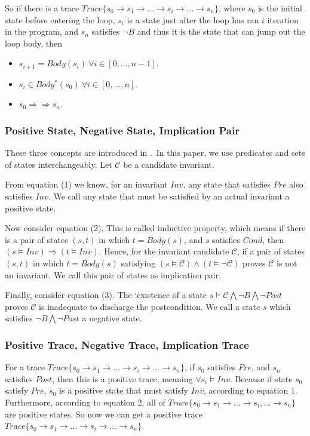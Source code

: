 So if there is a trace $Trace\{s_0 \to s_1 \to ...\to s_i \to ... \to s_n\}$, 
where $s_0$ is the initial state before entering the loop, 
$s_i$ is a state just after the loop has ran $i$ iteration in the program,
and $s_n$ satisfies $\neg B$ and thus it is the state that can jump out the loop body,
then 
\begin{itemize}
\item $s_{i+1} = Body(s_i)\ \forall i \in [0, \ldots, n-1]$.
\item $s_{i} \in Body^*(s_0)\ \forall i \in [0, \ldots, n]$.
\item $s_{0} \Rightarrow\Rightarrow s_{n}$.
\end{itemize}



\subsubsection{Positive State, Negative State, Implication Pair}
These three concepts are introduced in \cite{sharma2014invariant}.\
In this paper, we use predicates and sets of states interchangeably.
Let $\mathcal{C}$ be a candidate invariant.

From equation (1) we know, for an invariant $Inv$, 
any state that satisfies $Pre$ also satisfies $Inv$. 
We call any state that must be satisfied by an actual invariant a positive state. 


Now consider equation (2).
This is called inductive property, which means if there is a pair of states $(s, t)$ in which $t = Body(s)$, 
and $s$ satisfies $Cond$, then $(s \models Inv) \Rightarrow (t \models {Inv})$. 
Hence, for the invariant candidate $\mathcal{C}$, 
if a pair of states $(s, t)$ in which $t = Body(s)$ satisfying $(s \models \mathcal{C}) \land (t \models \neg \mathcal{C})$ proves $\mathcal{C}$ is not an invariant. 
We call this pair of states as implication pair.

Finally, consider equation (3).
The `existence of a state $s \models \mathcal{C} \bigwedge \neg B \bigwedge \neg Post$ proves $\mathcal{C}$ is inadequate to discharge the postcondition. 
We call a state $s$ which satisfies $\neg{B} \bigwedge \neg{Post}$ a negative state. 



\subsubsection{Positive Trace, Negative Trace, Implication Trace}
For a trace $Trace\{s_0 \to s_1 \to ... \to s_i \to ... \to s_n\}$, 
if $s_0$ satisfies $Pre$, and $s_n$ satisfies $Post$,
then this is a positive trace, meaning $\forall s_i \models Inv$.
Because if state $s_0$ satisfy $Pre$,
$s_0$ is a positive state that must satisfy $Inv$, according to equation 1.
Furthermore, according to equation 2,
all of $Trace\{s_0 \to s_1 \to ...\to s_i, ... \to s_n\}$ are positive states.
So now we can get a positive trace  $Trace\{s_0 \to s_1 \to ...\to s_i \to ... \to s_n\}$.

